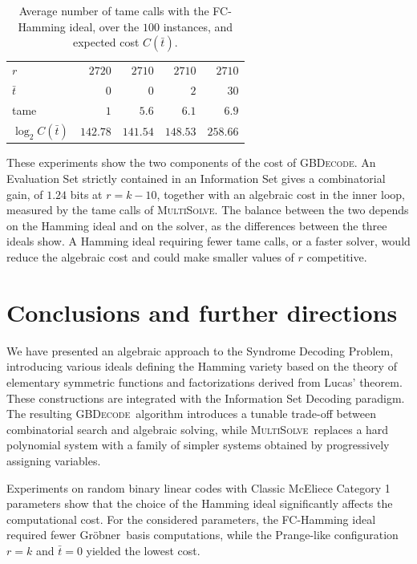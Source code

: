 \documentclass{amsart}
\def\Gr{Gr\"obner}
\def\MultiSolve{{\textsc{MultiSolve}}}
\def\GBDecode{{\textsc{GBDecode}}}
\def\bt{{\bar{t}}}
\begin{document}
\begin{table}[H]
\begin{center}
\small
\begin{tabular}{lrrrr}
\hline
$r$             & $2720$   & $2710$   & $2710$   & $2710$   \\
$\bt$           & $0$      & $0$      & $2$      & $30$     \\
\hline
tame            & $1$      & $5.6$    & $6.1$    & $6.9$    \\
$\log_2 C(\bt)$ & $142.78$ & $141.54$ & $148.53$ & $258.66$ \\
\hline
\end{tabular}
\end{center}
\caption{Average number of tame calls with the FC-Hamming ideal, over the $100$ instances,
and expected cost $C(\bt)$.}
\label{tab:params}
\end{table}

These experiments show the two components of the cost of \GBDecode. An Evaluation Set
strictly contained in an Information Set gives a combinatorial gain, of $1.24$ bits at $r =
k - 10$, together with an algebraic cost in the inner loop, measured by the tame calls of
\MultiSolve. The balance between the two depends on the Hamming ideal and on the solver, as
the differences between the three ideals show. A Hamming ideal requiring fewer tame
calls, or a faster solver, would reduce the algebraic cost and could make smaller values
of $r$ competitive.

\section{Conclusions and further directions}

We have presented an algebraic approach to the Syndrome Decoding Problem, introducing
various ideals defining the Hamming variety based on the theory of elementary symmetric
functions and factorizations derived from Lucas' theorem. These constructions are integrated
with the Information Set Decoding paradigm. The resulting \GBDecode\ algorithm introduces
a tunable trade-off between combinatorial search and algebraic solving, while \MultiSolve\
replaces a hard polynomial system with a family of simpler systems obtained by progressively
assigning variables.

Experiments on random binary linear codes with Classic McEliece Category 1 parameters
show that the choice of the Hamming ideal significantly affects the computational cost.
For the considered parameters, the FC-Hamming ideal required fewer \Gr\ basis computations,
while the Prange-like configuration $r = k$ and $\bt = 0$ yielded the lowest cost.
\end{document}

